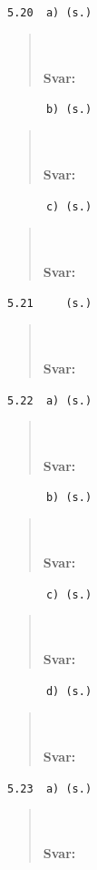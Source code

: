 \documentclass[a4paper]{article}
\newcommand{\tskcol}[1]{\textcolor{tskcol}{#1}}
\begin{document}
	\texttt{\tskcol{5.20~~a) (s.)}}
	\begin{quotation}
		\noindent
		\\ \\
		\textbf{Svar:}
	\end{quotation}
	
	\texttt{\tskcol{~~~~~~b) (s.)}}
	\begin{quotation}
		\noindent
		\\ \\
		\textbf{Svar:}
	\end{quotation}
	
	\texttt{\tskcol{~~~~~~c) (s.)}}
	\begin{quotation}
		\noindent
		\\ \\
		\textbf{Svar:}
	\end{quotation}
	
	\texttt{\tskcol{5.21~~~~ (s.)}}
	\begin{quotation}
		\noindent
		\\ \\
		\textbf{Svar:}
	\end{quotation}
	
	\texttt{\tskcol{5.22~~a) (s.)}}
	\begin{quotation}
		\noindent
		\\ \\
		\textbf{Svar:}
	\end{quotation}
	
	\texttt{\tskcol{~~~~~~b) (s.)}}
	\begin{quotation}
		\noindent
		\\ \\
		\textbf{Svar:}
	\end{quotation}
	
	\texttt{\tskcol{~~~~~~c) (s.)}}
	\begin{quotation}
		\noindent
		\\ \\
		\textbf{Svar:}
	\end{quotation}
	
	\texttt{\tskcol{~~~~~~d) (s.)}}
	\begin{quotation}
		\noindent
		\\ \\
		\textbf{Svar:}
	\end{quotation}
	
	\texttt{\tskcol{5.23~~a) (s.)}}
	\begin{quotation}
		\noindent
		\\ \\
		\textbf{Svar:}
	\end{quotation}
	
\end{document}
